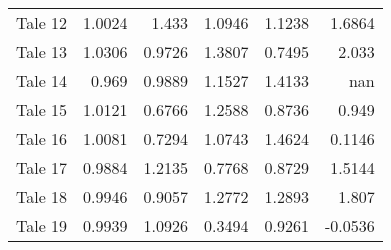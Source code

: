 \begin{table}[h]
\begin{tabular}{lrrrrr}
 Tale 12 &                        1.0024 &                      1.433  &                        1.0946 &                          1.1238 &                         1.6864 \\
 Tale 13 &                        1.0306 &                      0.9726 &                        1.3807 &                          0.7495 &                         2.033  \\
 Tale 14 &                        0.969  &                      0.9889 &                        1.1527 &                          1.4133 &                       nan      \\
 Tale 15 &                        1.0121 &                      0.6766 &                        1.2588 &                          0.8736 &                         0.949  \\
 Tale 16 &                        1.0081 &                      0.7294 &                        1.0743 &                          1.4624 &                         0.1146 \\
 Tale 17 &                        0.9884 &                      1.2135 &                        0.7768 &                          0.8729 &                         1.5144 \\
 Tale 18 &                        0.9946 &                      0.9057 &                        1.2772 &                          1.2893 &                         1.807  \\
 Tale 19 &                        0.9939 &                      1.0926 &                        0.3494 &                          0.9261 &                        -0.0536 \\
\bottomrule
\end{tabular}
\end{table}